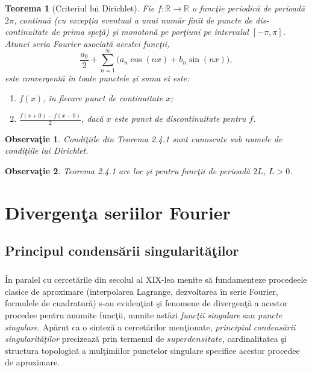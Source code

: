 \documentclass[a4paper,openany,12pt]{report}
\newtheorem{theorem}{Teorema}[section]
\newtheorem{notice}{Observa\c tie}[section]
\begin{document}
\begin{theorem}[Criteriul lui Dirichlet]
Fie $f:\mathbb{R}\rightarrow \mathbb{R}$ o func\c tie periodic\u a de perioad\u a $2\pi$, continu\u a (cu excep\c tia eventual a unui num\u ar finit de puncte de dis-continuitate de prima spe\c t\u a) \c si monoton\u a pe por\c tiuni pe intervalul $[-\pi, \pi]$. Atunci seria Fourier asociat\u a acestei func\c tii, 
\begin{equation*}
\frac{a_0}{2} + \sum_{n=1}^\infty \Big(a_n\cos(nx) + b_n\sin(nx)\Big),
\end{equation*} 
este convergent\u a \^ in toate punctele \c si suma ei este:
\begin{enumerate}
\item $f(x)$, \^ in fiecare punct de continuitate $x$;
\item $\frac{f(x+0)-f(x-0)}{2}$, dac\u a $x$ este punct de discontinuitate pentru $f$.
\end{enumerate}
\end{theorem}
\begin{notice} Condi\c tiile din Teorema 2.4.1 sunt cunoscute sub numele de \textit{condi\c tiile lui Dirichlet}.
\end{notice}
\begin{notice} Teorema 2.4.1 are loc \c si pentru func\c tii de perioad\u a $2L$, $L>0$.
\end{notice}



\chapter{Divergen\c ta seriilor Fourier}
\section{Principul condens\u arii singularit\u a\c tilor}
\paragraph*{}\^ In paralel cu cercet\u arile din secolul al XIX-lea menite s\u a fundamenteze procedeele clasice de aproximare (interpolarea Lagrange, dezvoltarea \^ in serie Fourier, formulele de cuadratur\u a) s-au eviden\c tiat \c si fenomene de divergen\c t\u a a acestor procedee pentru anumite func\c tii, numite ast\u azi \textit{func\c tii singulare }sau \textit{puncte singulare}. Ap\u arut ca o sintez\u a a cercet\u arilor men\c tionate, \textit{principiul condens\u arii singularit\u a\c tilor} precizeaz\u a prin termenul de $superdensitate$, cardinalitatea \c si structura topologic\u a a mul\c timiilor punctelor singulare specifice acestor procedee de aproximare. 
\end{document}
